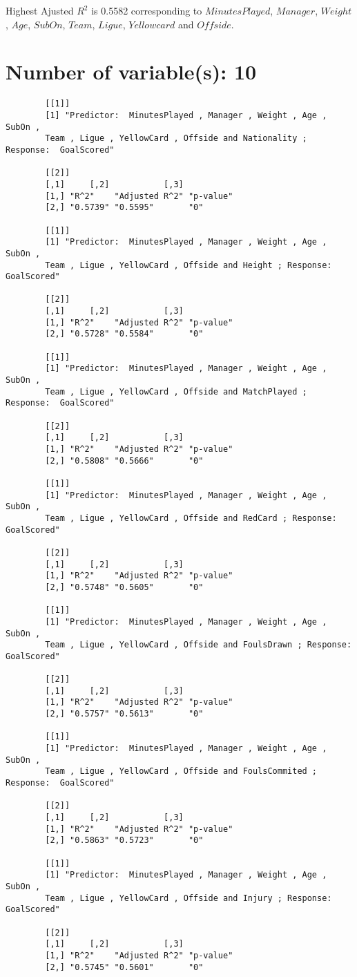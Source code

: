\documentclass[12pt]{article}
\begin{document}
	Highest Ajusted $ R^2 $ is 0.5582 corresponding to $ MinutesPlayed $, $ Manager $, $ Weight $, $ Age $, $ SubOn $, $ Team $, $ Ligue $, $ Yellowcard $ and $ Offside $.
	
	\section{Number of variable(s): 10}
	\begin{verbatim}
		[[1]]
		[1] "Predictor:  MinutesPlayed , Manager , Weight , Age , SubOn , 
		Team , Ligue , YellowCard , Offside and Nationality ; Response:  GoalScored"
		
		[[2]]
		[,1]     [,2]           [,3]     
		[1,] "R^2"    "Adjusted R^2" "p-value"
		[2,] "0.5739" "0.5595"       "0"      
		
		[[1]]
		[1] "Predictor:  MinutesPlayed , Manager , Weight , Age , SubOn , 
		Team , Ligue , YellowCard , Offside and Height ; Response:  GoalScored"
		
		[[2]]
		[,1]     [,2]           [,3]     
		[1,] "R^2"    "Adjusted R^2" "p-value"
		[2,] "0.5728" "0.5584"       "0"      
		
		[[1]]
		[1] "Predictor:  MinutesPlayed , Manager , Weight , Age , SubOn , 
		Team , Ligue , YellowCard , Offside and MatchPlayed ; Response:  GoalScored"
		
		[[2]]
		[,1]     [,2]           [,3]     
		[1,] "R^2"    "Adjusted R^2" "p-value"
		[2,] "0.5808" "0.5666"       "0"      
		
		[[1]]
		[1] "Predictor:  MinutesPlayed , Manager , Weight , Age , SubOn , 
		Team , Ligue , YellowCard , Offside and RedCard ; Response:  GoalScored"
		
		[[2]]
		[,1]     [,2]           [,3]     
		[1,] "R^2"    "Adjusted R^2" "p-value"
		[2,] "0.5748" "0.5605"       "0"      
		
		[[1]]
		[1] "Predictor:  MinutesPlayed , Manager , Weight , Age , SubOn , 
		Team , Ligue , YellowCard , Offside and FoulsDrawn ; Response:  GoalScored"
		
		[[2]]
		[,1]     [,2]           [,3]     
		[1,] "R^2"    "Adjusted R^2" "p-value"
		[2,] "0.5757" "0.5613"       "0"      
		
		[[1]]
		[1] "Predictor:  MinutesPlayed , Manager , Weight , Age , SubOn , 
		Team , Ligue , YellowCard , Offside and FoulsCommited ; Response:  GoalScored"
		
		[[2]]
		[,1]     [,2]           [,3]     
		[1,] "R^2"    "Adjusted R^2" "p-value"
		[2,] "0.5863" "0.5723"       "0"      
		
		[[1]]
		[1] "Predictor:  MinutesPlayed , Manager , Weight , Age , SubOn , 
		Team , Ligue , YellowCard , Offside and Injury ; Response:  GoalScored"
		
		[[2]]
		[,1]     [,2]           [,3]     
		[1,] "R^2"    "Adjusted R^2" "p-value"
		[2,] "0.5745" "0.5601"       "0"      
	\end{verbatim}
	
\end{document}
